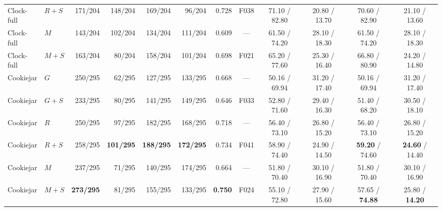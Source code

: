 \begin{table}[t]
{\begin{tabular}{@{}llrrrrrccccc@{}}
Clock-full & $R+S$ & 171/204 & 148/204 & 169/204 & 96/204 & 0.728 & F038 & 71.10 / 82.80 & 20.80 / 13.70 & 70.60 / 82.90 & 21.10 / 13.60\\
Clock-full & $M$ & 143/204 & 102/204 & 134/204 & 111/204 & 0.609 & --- & 61.50 / 74.20 & 28.10 / 18.30 & 61.50 / 74.20 & 28.10 / 18.30\\
Clock-full & $M+S$ & 163/204 & 80/204 & 158/204 & 101/204 & 0.698 & F021 & 65.20 / 77.60 & 25.30 / 16.40 & 66.80 / 80.90 & 24.20 / 14.80\\\midrule
Cookiejar & $G$ & 250/295 & 62/295 & 127/295 & 133/295 & 0.668 & --- & 50.16 / 69.94 & 31.20 / 17.40 & 50.16 / 69.94 & 31.20 / 17.40\\
Cookiejar & $G+S$ & 233/295 & 80/295 & 141/295 & 149/295 & 0.646 & F033 & 52.80 / 71.60 & 29.40 / 16.30 & 51.40 / 68.20 & 30.50 / 18.10\\
Cookiejar & $R$ & 250/295 & 97/295 & 182/295 & 168/295 & 0.718 & --- & 56.40 / 73.10 & 26.80 / 15.20 & 56.40 / 73.10 & 26.80 / 15.20\\
Cookiejar & $R+S$ & 258/295 & \textbf{101/295} & \textbf{188/295} & \textbf{172/295} & 0.734 & F041 & 58.90 / 74.40 & 24.90 / 14.50 & \textbf{59.20} / 74.60 & \textbf{24.60} / 14.40\\
Cookiejar & $M$ & 237/295 & 71/295 & 140/295 & 174/295 & 0.664 & --- & 51.80 / 70.40 & 30.10 / 16.90 & 51.80 / 70.40 & 30.10 / 16.90\\
Cookiejar & $M+S$ & \textbf{273/295} & 81/295 & 155/295 & 133/295 & \textbf{0.750} & F024 & 55.10 / 72.80 & 27.90 / 15.60 & 57.65 / \textbf{74.88} & 25.80 / \textbf{14.20}\\
\bottomrule\end{tabular}}\end{table}
